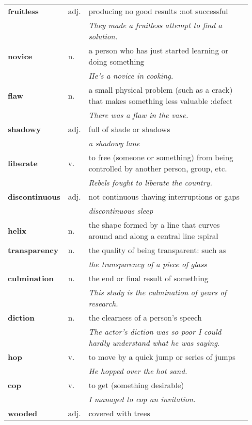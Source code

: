 \documentclass[a4paper]{article}
\begin{document}
\begin{longtable}{llp{11cm}}
\textbf{fruitless} & adj. &  producing no good results :not successful \\
 & & \textit{They made a fruitless attempt to find a solution.}\\[0.08cm]
\textbf{novice} & n. &  a person who has just started learning or doing something \\
 & & \textit{He's a novice in cooking.}\\[0.08cm]
\textbf{flaw} & n. &  a small physical problem (such as a crack) that makes something less valuable :defect \\
 & & \textit{There was a flaw in the vase.}\\[0.08cm]
\textbf{shadowy} & adj. &  full of shade or shadows \\
 & & \textit{a shadowy lane}\\[0.08cm]
\textbf{liberate} & v. &  to free (someone or something) from being controlled by another person, group, etc. \\
 & & \textit{Rebels fought to liberate the country.}\\[0.08cm]
\textbf{discontinuous} & adj. &  not continuous :having interruptions or gaps \\
 & & \textit{discontinuous sleep}\\[0.08cm]
\textbf{helix} & n. &  the shape formed by a line that curves around and along a central line :spiral \\[0.08cm]
\textbf{transparency} & n. &  the quality of being transparent: such as\\
 & & \textit{the transparency of a piece of glass}\\[0.08cm]
\textbf{culmination} & n. &  the end or final result of something \\
 & & \textit{This study is the culmination of years of research.}\\[0.08cm]
\textbf{diction} & n. &  the clearness of a person's speech \\
 & & \textit{The actor's diction was so poor I could hardly understand what he was saying.}\\[0.08cm]
\textbf{hop} & v. &  to move by a quick jump or series of jumps \\
 & & \textit{He hopped over the hot sand.}\\[0.08cm]
\textbf{cop} & v. &  to get (something desirable) \\
 & & \textit{I managed to cop an invitation.}\\[0.08cm]
\textbf{wooded} & adj. &  covered with trees \\

\end{longtable}
\end{document}
